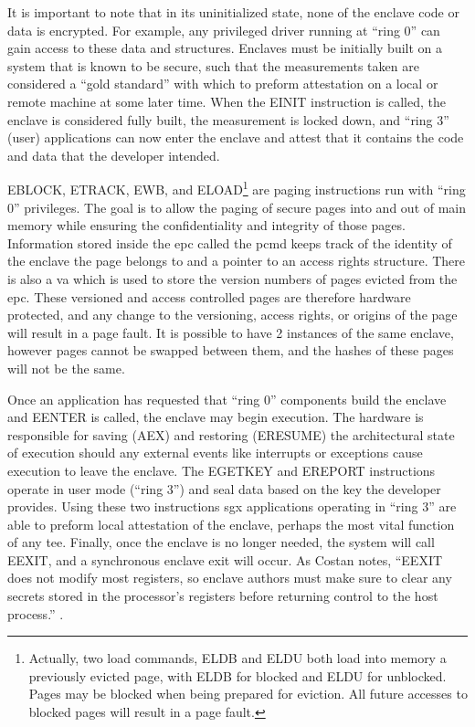 It is important to note that in its uninitialized state, none of the enclave code or data is encrypted. For example, any privileged driver running at ``\gls{ring} 0'' can gain access to these data and structures. Enclaves must be initially built on a system that is known to be secure, such that the measurements taken are considered a ``gold standard'' with which to preform attestation on a local or remote machine at some later time. When the EINIT instruction is called, the enclave is considered fully built, the measurement is locked down, and ``\gls{ring} 3'' (user) applications can now enter the enclave and attest that it contains the code and data that the developer intended. 

EBLOCK, ETRACK, EWB, and ELOAD\footnote{Actually, two load commands, ELDB and ELDU both load into memory a previously evicted page, with ELDB for blocked and ELDU for unblocked. Pages may be blocked when being prepared for eviction. All future accesses to blocked pages will result in a page fault.} are paging instructions run with ``\gls{ring} 0'' privileges. The goal is to allow the paging of secure pages into and out of main memory while ensuring the confidentiality and integrity of those pages. Information stored inside the \gls{epc} called the \gls{pcmd} keeps track of the identity of the enclave the page belongs to and a pointer to an access rights structure. There is also a \gls{va} which is used to store the version numbers of pages evicted from the \gls{epc}. These versioned and access controlled pages are therefore hardware protected, and any change to the versioning, access rights, or origins of the page will result in a page fault. It is possible to have 2 instances of the same enclave, however pages cannot be swapped between them, and the hashes of these pages will not be the same.

Once an application has requested that ``\gls{ring} 0'' components build the enclave and EENTER is called, the enclave may begin execution. The hardware is responsible for saving (AEX) and restoring (ERESUME) the architectural state of execution should any external events like interrupts or exceptions cause execution to leave the enclave. The EGETKEY and EREPORT instructions operate in user mode (``\gls{ring} 3'') and seal data based on the key the developer provides. Using these two instructions \gls{sgx} applications operating in ``\gls{ring} 3'' are able to preform local attestation of the enclave, perhaps the most vital function of any \gls{tee}. Finally, once the enclave is no longer needed, the system will call EEXIT, and a synchronous enclave exit will occur. As Costan notes, ``EEXIT does not modify most registers, so enclave authors must make sure to clear any secrets stored in the processor’s registers before returning control to the host process.'' \cite{Costan2016}.

